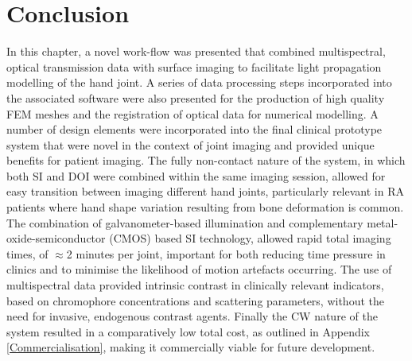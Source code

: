 \documentclass[twoside]{bhamthesis}
\theoremstyle{definition}
\begin{document}
\begin{comment}
A breakdown of typical times for the different stages of computational processing are shown in Table \ref{tab:Processing_time}.

The largest allocations of memory were from construction of the high density forward mesh and the spectrally constrained Jacobian, which required $/approx$? and $/approx$? of RAM respectively.

\bgroup
\def\arraystretch{1.2}
\begin{table}[!ht]
\small
\begin{center}
 \begin{tabular}{c| c c c c c} 
  & SI Processing & FEM Mesh & Inverse Basis &  DOT Image & Total \\ 
  &  & Generation & Generation & Reconstruction &  \\ 

 \hline
Time (s) &  $\pm$   &  123.4 $\pm$ 5.2 &  $\pm$ &  $\pm$ &  $\pm$  \\  
\end{tabular}
\caption{Time taken for each section of data processing and image reconstruction (mean $\pm$ S.D.) for 10 example joints from 10 patients in the final clinical study.}
\label{tab:Processing_time}
\end{center}
\end{table}
\egroup
\end{comment}

\section{Conclusion}

In this chapter, a novel work-flow was presented that combined multispectral, optical transmission data with surface imaging to facilitate light propagation modelling of the hand joint. A series of data processing steps incorporated into the associated software were also presented for the production of high quality FEM meshes and the registration of optical data for numerical modelling. A number of design elements were incorporated into the final clinical prototype system that were novel in the context of joint imaging and provided unique benefits for patient imaging. The fully non-contact nature of the system, in which both SI and DOI were combined within the same imaging session, allowed for easy transition between imaging different hand joints, particularly relevant in RA patients where hand shape variation resulting from bone deformation is common. The combination of galvanometer-based illumination and complementary metal-oxide-semiconductor (CMOS) based SI technology, allowed rapid total imaging times, of $\approx$2 minutes per joint, important for both reducing time pressure in clinics and to minimise the likelihood of motion artefacts occurring. The use of multispectral data provided intrinsic contrast in clinically relevant indicators, based on chromophore concentrations and scattering parameters, without the need for invasive, endogenous contrast agents. Finally the CW nature of the system resulted in a comparatively low total cost, as outlined in Appendix \ref{Commercialisation}, making it commercially viable for future development. 
\end{document}
